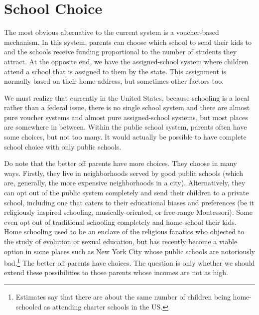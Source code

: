 \section{School Choice}

The most obvious alternative to the current system is a voucher-based
mechanism. In this system, parents can choose which school to send their kids
to and the schools receive funding proportional to the number of students they
attract. At the opposite end, we have the assigned-school system where children
attend a school that is assigned to them by the state. This assignment is
normally based on their home address, but sometimes other factors too.

We must realize that currently in the United States, because schooling is a
local rather than a federal issue, there is no single school system and there
are almost pure voucher systems and almost pure assigned-school systems, but
most places are somewhere in between. Within the public school system, parents
often have some choices, but not too many. It would actually be possible to
have complete school choice with only public schools.

Do note that the better off parents have more choices. They choose in many
ways. Firstly, they live in neighborhoods served by good public schools (which
are, generally, the more expensive neighborhoods in a city). Alternatively,
they can opt out of the public system completely and send their children to a
private school, including one that caters to their educational biases and
preferences (be it religiously inspired schooling, musically-oriented, or
free-range Montessori). Some even opt out of traditional schooling completely
and home-school their kids. Home schooling used to be an enclave of the
religious fanatics who objected to the study of evolution or sexual education,
but has recently become a viable option in some places such as New York City
whose public schools are notoriously bad.\footnote{Estimates
say that there are about the same number of children being home-schooled as
attending charter schools in the US.}
The better off parents have choices. The question is only whether we should
extend these possibilities to those parents whose incomes are not as high.

